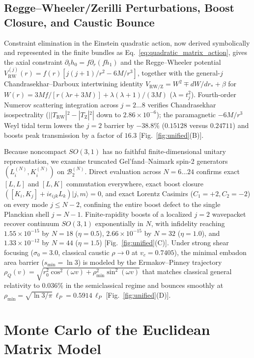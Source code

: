 \documentclass[onecolumn,11pt,aps,prd,amsmath,amssymb,nofootinbib,floatfix]{revtex4-2}
\newcommand{\calB}{\mathcal{B}}
\newcommand{\lP}{\ell_P}
\begin{document}
\subsection{Regge--Wheeler/Zerilli Perturbations, Boost Closure, and Caustic Bounce}\label{sec:unified_rw}

Constraint elimination in the Einstein quadratic action, now derived symbolically and represented in the finite bundles as Eq.~\eqref{eq:quadratic_matrix_action}, gives the axial constraint $\partial_t h_0=f\partial_r(f h_1)$ and the Regge--Wheeler potential $V_{\mathrm{RW}}^{(j)}(r)=f(r)[j(j+1)/r^2-6M/r^3]$, together with the general-$j$ Chandrasekhar--Darboux intertwining identity $V_{\mathrm{RW/Z}}=W^2\mp dW/dr_*+\beta$ for $W(r)=3Mf/[r(\lambda r+3M)]+\lambda(\lambda+1)/(3M)$ ($\lambda=t_j^2$). Fourth-order Numerov scattering integration across $j=2\dots 8$ verifies Chandrasekhar isospectrality ($||T_{\mathrm{RW}}|^2-|T_{\mathrm{Z}}|^2|$ down to $2.86\times 10^{-6}$); the paramagnetic $-6M/r^3$ Weyl tidal term lowers the $j=2$ barrier by $-38.8\%$ ($0.15128$ versus $0.24711$) and boosts peak transmission by a factor of $16.3$ [Fig.~\ref{fig:unified}(B)].

Because noncompact $SO(3,1)$ has no faithful finite-dimensional unitary representation, we examine truncated Gel'fand--Naimark spin-2 generators $(L_i^{(N)},K_i^{(N)})$ on $\calB_2^{(N)}$. Direct evaluation across $N=6\dots 24$ confirms exact $[L,L]$ and $[L,K]$ commutation everywhere, exact boost closure $([K_i,K_j]+i\epsilon_{ijk}L_k)|j,m\rangle=0$, and exact Lorentz Casimirs ($C_1=+2,C_2=-2$) on every mode $j\le N-2$, confining the entire boost defect to the single Planckian shell $j=N-1$. Finite-rapidity boosts of a localized $j=2$ wavepacket recover continuum $SO(3,1)$ exponentially in $N$, with infidelity reaching $1.55\times 10^{-15}$ by $N=18$ ($\eta=0.5$), $2.66\times 10^{-15}$ by $N=32$ ($\eta=1.0$), and $1.33\times 10^{-12}$ by $N=44$ ($\eta=1.5$) [Fig.~\ref{fig:unified}(C)]. Under strong shear focusing ($\sigma_0=3.0$, classical caustic $\rho\to 0$ at $v_c=0.7405$), the minimal embadon area barrier ($s_{\min}=\ln 3$) is modeled by the Ermakov--Pinney trajectory $\rho_Q(v)=\sqrt{r_0^2\cos^2(\omega v)+\rho_{\min}^2\sin^2(\omega v)}$ that matches classical general relativity to $0.036\%$ in the semiclassical regime and bounces smoothly at $\rho_{\min}=\sqrt{\ln 3/\pi}\,\lP=0.5914\,\lP$ [Fig.~\ref{fig:unified}(D)].

\section{Monte Carlo of the Euclidean Matrix Model}\label{sec:hmc}
\end{document}
